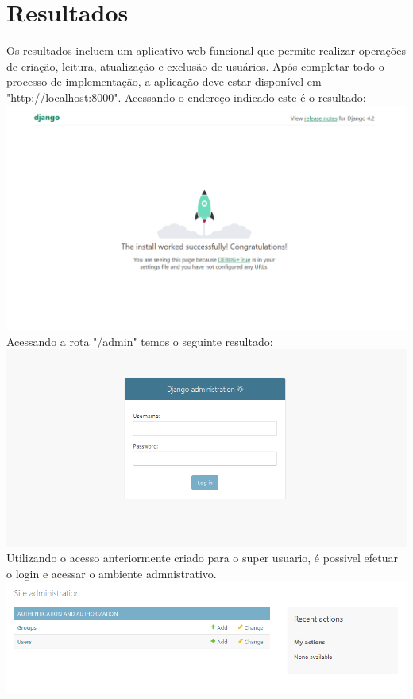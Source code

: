 \documentclass[11pt]{article} %
\begin{document}
\section{Resultados}
Os resultados incluem um aplicativo web funcional que permite  realizar operações de criação, leitura, atualização e exclusão de usuários.
Após completar todo o processo de implementação, a aplicação deve estar disponível em "http://localhost:8000". Acessando o endereço indicado este é o resultado:\\
\includegraphics[width=150mm,scale=0.7]{images/s9.png}\\
Acessando a rota "/admin" temos o seguinte resultado:\\
\includegraphics[width=150mm,scale=0.7]{images/s10.PNG}\\
Utilizando o acesso anteriormente criado para o super usuario, é possivel efetuar o login e acessar o ambiente admnistrativo.\\
\includegraphics[width=150mm,scale=0.7]{images/s11.PNG}
\end{document}
